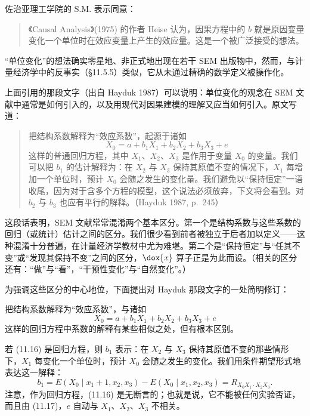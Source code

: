 佐治亚理工学院的 S.M. 表示同意：

\begin{quote}\kaishu
《Causal Analysis》(1975) 的作者 Heise 认为，因果方程中的 $b$ 就是原因变量变化一个单位时在效应变量上产生的效应量。这是一个被广泛接受的想法。
\end{quote}


“单位变化”的想法确实零星地、非正式地出现在若干 SEM 出版物中，然而，与计量经济学中的反事实（\S11.5.5）类似，它从未通过精确的数学定义被操作化。

上面引用的那段文字（出自 Hayduk 1987）可以说明：单位变化的观念在 SEM 文献中通常是如何引入的，以及用现代对因果建模的理解又应当如何引入。原文写道：

\begin{quote}\kaishu
把结构系数解释为“效应系数”，起源于诸如
\[
X_0=a+b_1X_1+b_2X_2+b_3X_3+e
\]
这样的普通回归方程，其中 $X_1$、$X_2$、$X_3$ 是作用于变量 $X_0$ 的变量。我们可以把 $b_1$ 的估计解释为：在 $X_2$ 与 $X_3$ 保持其原值不变的情况下，$X_1$ 每增加一个单位时，预计 $X_0$ 会随之发生的变化量。我们避免以“保持恒定”一语收尾，因为对于含多个方程的模型，这个说法必须放弃，下文将会看到。对 $b_2$ 与 $b_3$ 也应有平行的解释。（Hayduk 1987, p.~245）
\end{quote}

这段话表明，SEM 文献常常混淆两个基本区分。第一个是结构系数与这些系数的回归（或统计）估计之间的区分。我们很少看到前者被独立于后者加以定义——这种混淆十分普遍，在计量经济学教材中尤为难堪。第二个是“保持恒定”与“任其不变”或“发现其保持不变”之间的区分，$\dox{x}$ 算子正是为此而设。（相关的区分还有：“做”与“看”，“干预性变化”与“自然变化”。）

为强调这些区分的中心地位，下面提出对 Hayduk 那段文字的一处简明修订：


把结构系数解释为“效应系数”，与诸如
\begin{equation}
X_0=a+b_1X_1+b_2X_2+b_3X_3+e \tag{11.16}
\end{equation}
这样的回归方程中系数的解释有某些相似之处，但有根本区别。

若 \textup{(11.16)} 是回归方程，则 $b_1$ 表示：在 $X_2$ 与 $X_3$ 保持其原值不变的那些情形下，$X_1$ 每变化一个单位时，预计 $X_0$ 会随之发生的变化。我们用条件期望形式地表达这一解释：
\begin{equation}
b_1=E(X_0\mid x_1+1,x_2,x_3)-E(X_0\mid x_1,x_2,x_3)=R_{X_0X_1\cdot X_2X_3}. \tag{11.17}
\end{equation}
注意，作为回归方程，\textup{(11.16)} 是无断言的；也就是说，它不能被任何实验否证，而且由 \textup{(11.17)}，$e$ 自动与 $X_1$、$X_2$、$X_3$ 不相关。

